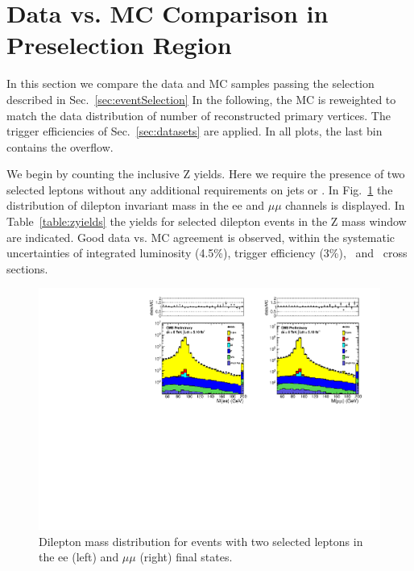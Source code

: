 \clearpage

\section{Data vs. MC Comparison in Preselection Region}
\label{sec:yields}

In this section we compare the data and MC samples passing the selection described in Sec.~\ref{sec:eventSelection}
In the following, the MC is reweighted to match the data distribution of number of reconstructed primary vertices.
The trigger efficiencies of Sec.~\ref{sec:datasets} are applied. In all plots, the last bin contains the overflow.

We begin by counting the inclusive Z yields. Here we require the presence of two selected leptons without
any additional requirements on jets or \MET. In Fig.~\ref{fig:dilmass} the distribution of dilepton invariant
mass in the ee and $\mu\mu$ channels is displayed. In Table~\ref{table:zyields} the yields for selected dilepton
events in the Z mass window are indicated. Good data vs. MC agreement is observed, within the systematic uncertainties
of integrated luminosity (4.5\%), trigger efficiency (3\%), \zjets\ and \ttbar\ cross sections.

\begin{figure}[hbt]
  \begin{center}
	\includegraphics[width=1.0\linewidth]{plots/dilmass_ee_mm.pdf}
	\caption{
	  \label{fig:dilmass}\protect 
	  Dilepton mass distribution for events with two selected leptons
	  in the ee (left) and $\mu\mu$ (right) final states.}
  \end{center}
\end{figure}


